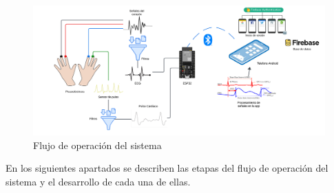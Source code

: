    \begin{figure}[H]
        \centering
        \includegraphics[width=1\textwidth]{img/Desarrollo/flujo_operacion.png}
        \caption[Flujo de operación del sistema.]{Flujo de operación del sistema}
        \label{fig:Flujo_Operacion}
    \end{figure}

    En los siguientes apartados se describen las etapas del flujo de operación del sistema y el desarrollo de cada una de ellas.

